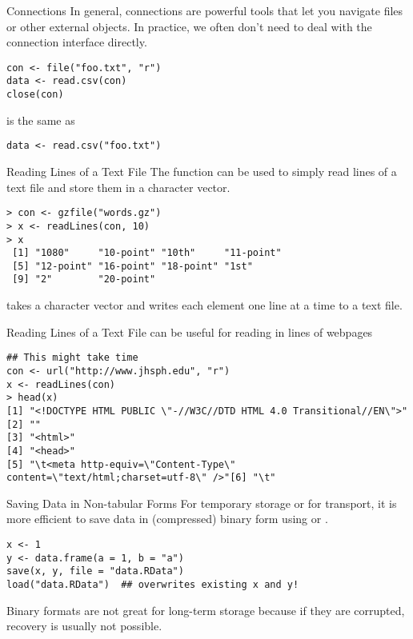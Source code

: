 \documentclass[aspectratio=169]{beamer}
\begin{document}
\begin{frame}[fragile]{Connections}
In general, connections are powerful tools that let you navigate files
or other external objects.  In practice, we often don't need to deal
with the connection interface directly.
\begin{verbatim}
con <- file("foo.txt", "r")
data <- read.csv(con)
close(con)
\end{verbatim}
is the same as
\begin{verbatim}
data <- read.csv("foo.txt")
\end{verbatim}
\end{frame}


\begin{frame}[fragile]{Reading Lines of a Text File}
The  function can be used to simply read lines of a
text file and store them in a character vector.
\begin{verbatim}
> con <- gzfile("words.gz")
> x <- readLines(con, 10)
> x
 [1] "1080"     "10-point" "10th"     "11-point"
 [5] "12-point" "16-point" "18-point" "1st"
 [9] "2"        "20-point"
\end{verbatim}
 takes a character vector and writes each element one
line at a time to a text file.
\end{frame}


\begin{frame}[fragile]{Reading Lines of a Text File}
 can be useful for reading in lines of webpages
\begin{verbatim}
## This might take time
con <- url("http://www.jhsph.edu", "r")
x <- readLines(con)
> head(x)
[1] "<!DOCTYPE HTML PUBLIC \"-//W3C//DTD HTML 4.0 Transitional//EN\">"
[2] ""
[3] "<html>"
[4] "<head>"
[5] "\t<meta http-equiv=\"Content-Type\" content=\"text/html;charset=utf-8\" />"[6] "\t"
\end{verbatim}
\end{frame}

\begin{frame}[fragile]{Saving Data in Non-tabular Forms}
For temporary storage or for transport, it is more efficient to save
data in (compressed) binary form using  or
.
\begin{verbatim}
x <- 1
y <- data.frame(a = 1, b = "a")
save(x, y, file = "data.RData")
load("data.RData")  ## overwrites existing x and y!
\end{verbatim}
Binary formats are not great for long-term storage because if they are
corrupted, recovery is usually not possible.
\end{frame}
\end{document}
